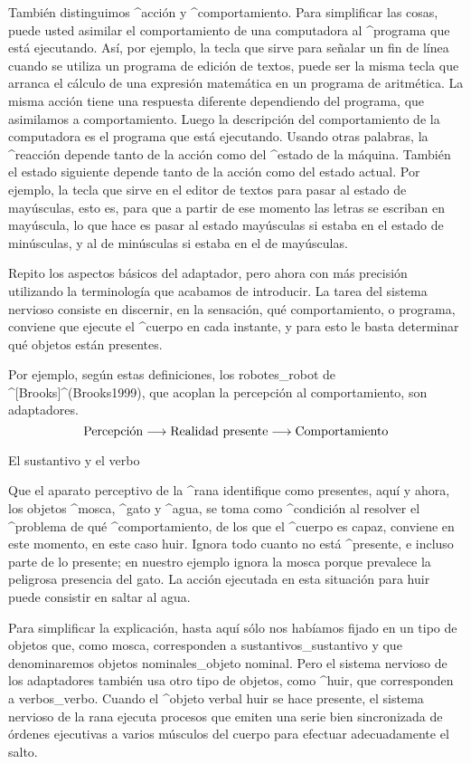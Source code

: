 También distinguimos ^{acción} y ^{comportamiento}. Para simplificar las
cosas, puede usted asimilar el comportamiento de una computadora al
^{programa} que está ejecutando. Así, por ejemplo, la tecla que sirve
para señalar un fin de línea cuando se utiliza un programa de edición de
textos, puede ser la misma tecla que arranca el cálculo de una expresión
matemática en un programa de aritmética. La misma acción tiene una
respuesta diferente dependiendo del programa, que asimilamos a
comportamiento. Luego la descripción del comportamiento de la
computadora es el programa que está ejecutando. Usando otras palabras,
la ^{reacción} depende tanto de la acción como del ^{estado} de la
máquina. También el estado siguiente depende tanto de la acción como del
estado actual. Por ejemplo, la tecla que sirve en el editor de textos
para pasar al estado de mayúsculas, esto es, para que a partir de ese
momento las letras se escriban en mayúscula, lo que hace es pasar al
estado mayúsculas si estaba en el estado de minúsculas, y al de
minúsculas si estaba en el de mayúsculas.

Repito los aspectos básicos del adaptador, pero ahora con más precisión
utilizando la terminología que acabamos de introducir. La tarea del
sistema nervioso consiste en discernir, en la sensación, qué
comportamiento, o programa, conviene que ejecute el ^{cuerpo} en cada
instante, y para esto le basta determinar qué objetos están presentes.

Por ejemplo, según estas definiciones, los robotes_{robot} de
^[Brooks]^(Brooks1999), que acoplan la percepción al comportamiento, son
adaptadores.
$$\hbox{Percepción} \longrightarrow \hbox{Realidad presente}
   \longrightarrow \hbox{Comportamiento}$$


\Section El sustantivo y el verbo

Que el aparato perceptivo de la ^{rana} identifique como presentes, aquí
y ahora, los objetos ^{mosca}, ^{gato} y ^{agua}, se toma como
^{condición} al resolver el ^{problema} de qué ^{comportamiento}, de los
que el ^{cuerpo} es capaz, conviene en este momento, en este caso huir.
Ignora todo cuanto no está ^{presente}, e incluso parte de lo presente;
en nuestro ejemplo ignora la mosca porque prevalece la peligrosa
presencia del gato. La acción ejecutada en esta situación para huir
puede consistir en saltar al agua.

Para simplificar la explicación, hasta aquí sólo nos habíamos fijado en
un tipo de objetos que, como mosca, corresponden a
sustantivos_{sustantivo} y que denominaremos objetos nominales_{objeto
nominal}. Pero el sistema nervioso de los adaptadores también usa otro
tipo de objetos, como ^{huir}, que corresponden a verbos_{verbo}. Cuando
el ^{objeto verbal} huir se hace presente, el sistema nervioso de la
rana ejecuta procesos que emiten una serie bien sincronizada de órdenes
ejecutivas a varios músculos del cuerpo para efectuar adecuadamente el
salto.


